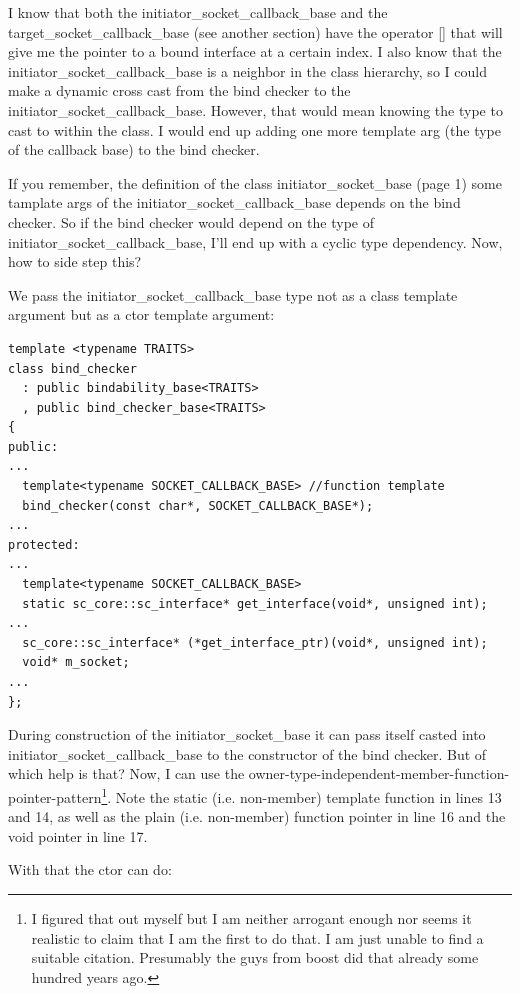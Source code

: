 \documentclass[a4paper,10pt]{article}          %
\newcommand{\code}[1]{{\ttfamily#1}}
\begin{document}
I know that both the \code{initiator\_socket\_callback\_base} and the \code{target\_socket\_callback\_base} (see another section) have the \code{operator []} that will give me the pointer to a bound interface at a certain index. I also know that the \code{initiator\_socket\_callback\_base} is a neighbor in the class hierarchy, so I could make a dynamic cross cast from the bind checker to the \code{initiator\_socket\_callback\_base}. However, that would mean knowing the type to cast to within the class. I would end up adding one more template arg (the type of the callback base) to the bind checker.

If you remember, the definition of the class \code{initiator\_socket\_base} (page 1) some tamplate args of the \code{initiator\_socket\_callback\_base} depends on the bind checker. So if the bind checker would depend on the type of \code{initiator\_socket\_callback\_base}, I'll end up with a cyclic type dependency. Now, how to side step this?

We pass the \code{initiator\_socket\_callback\_base} type not as a class template argument but as a ctor template argument:

\begin{lstlisting}
template <typename TRAITS>
class bind_checker
  : public bindability_base<TRAITS>
  , public bind_checker_base<TRAITS>
{
public:
...
  template<typename SOCKET_CALLBACK_BASE> //function template
  bind_checker(const char*, SOCKET_CALLBACK_BASE*);
...
protected:
...
  template<typename SOCKET_CALLBACK_BASE>
  static sc_core::sc_interface* get_interface(void*, unsigned int);
...
  sc_core::sc_interface* (*get_interface_ptr)(void*, unsigned int);
  void* m_socket;
...
};
\end{lstlisting}

During construction of the  \code{initiator\_socket\_base} it can pass itself casted into  \code{initiator\_socket\_callback\_base} to the constructor of the bind checker. But of which help is that? Now, I can use the owner-type-independent-member-function-pointer-pattern\footnote{I figured that out myself but I am neither arrogant enough nor seems it realistic to claim that I am the first to do that. I am just unable to find a suitable citation. Presumably the guys from boost did that already some hundred years ago.}. Note the static (i.e. non-member) template function in lines 13 and 14, as well as the plain (i.e. non-member) function pointer in line 16 and the void pointer in line 17.

With that the ctor can do:
\end{document}
